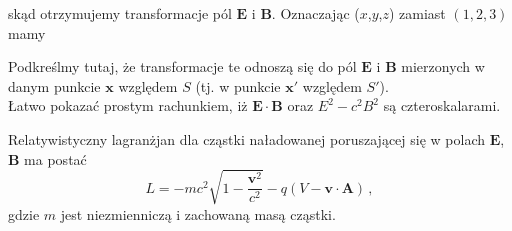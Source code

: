 \documentclass[../main.tex]{subfiles}
\begin{document}
skąd otrzymujemy transformacje pól \(\mathbf{E}\) i \(\mathbf{B}\). Oznaczając (\(x\),\(y\),\(z\)) zamiast \((1,2,3)\) mamy\\

\noindent{}
\medskip

Podkreślmy tutaj, że transformacje te odnoszą się do pól \(\mathbf{E}\) i \(\mathbf{B}\) mierzonych w danym punkcie \(\mathbf{x}\) względem \(S\) (tj. w punkcie \(\mathbf{x}'\) względem \(S'\)).\\
Łatwo pokazać prostym rachunkiem, iż \(\mathbf{E}\cdot\mathbf{B}\) oraz \(E^2-c^2B^2\) są czteroskalarami.
\medskip

Relatywistyczny lagranżjan dla cząstki naładowanej poruszającej się w polach \(\mathbf{E}\), \(\mathbf{B}\) ma postać
\begin{equation*}
    L=-mc^2\sqrt{1-\frac{\mathbf{v}^2}{c^2}}-q(V-\mathbf{v}\cdot\mathbf{A})\,,
\end{equation*}
gdzie \(m\) jest niezmienniczą i zachowaną masą cząstki.
\medskip
\end{document}
